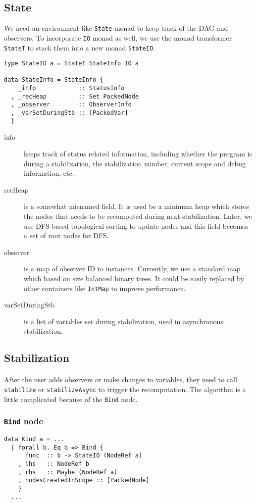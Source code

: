 \documentclass[a4paper, twocolumn]{article}
\newcommand{\code}{\texttt} %
\begin{document}
\subsection{State}
We need an environment like \code{State} monad to keep track of the DAG and observers. To incorporate \code{IO} monad as well, we use the monad transformer \code{StateT} to stack them into a new monad \code{StateIO}.

\begin{lstlisting}[caption=State]
type StateIO a = StateT StateInfo IO a

data StateInfo = StateInfo {
    _info            :: StatusInfo
  , _recHeap         :: Set PackedNode
  , _observer        :: ObserverInfo
  , _varSetDuringStb :: [PackedVar]
  }
\end{lstlisting}

\begin{description}
  \item[info] keeps track of status related information, including whether the program is during a stabilization, the stabilization number, current scope and debug information, etc.
  \item[recHeap] is a somewhat misnamed field. It is used be a minimum heap which stores the nodes that needs to be recomputed during next stabilization. Later, we use DFS-based topological sorting to update nodes and this field becomes a set of root nodes for DFS.
  \item[observer] is a map of observer ID to instances. Currently, we use a standard map which based on size balanced binary trees. It could be easily replaced by other containers like \code{IntMap} to improve performance.
  \item[varSetDuringStb] is a list of variables set during stabilization, used in asynchronous stabilization.
\end{description}

\subsection{Stabilization}
\paragraph{} After the user adds observers or make changes to variables, they need to call \code{stabilize} or \code{stabilizeAsync} to trigger the recomputation. The algorithm is a little complicated because of the \code{Bind} node. 

\subsubsection{\code{Bind} node}
\begin{lstlisting}[caption=Bind node, label={lst:bind}]
data Kind a = ...
  | forall b. Eq b => Bind {
      func  :: b -> StateIO (NodeRef a)
    , lhs   :: NodeRef b
    , rhs   :: Maybe (NodeRef a)
    , nodesCreatedInScope :: [PackedNode]
    }
  ...
\end{lstlisting}
\end{document}
